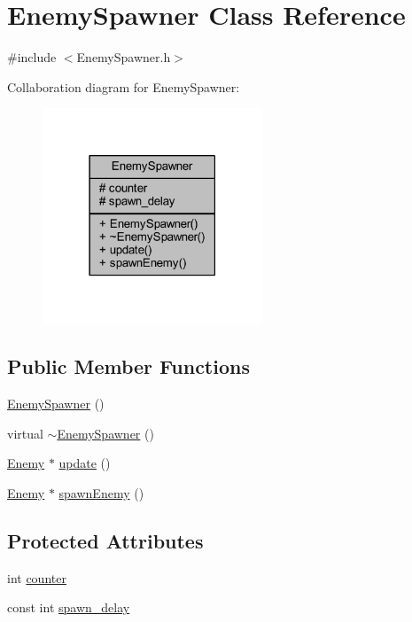 \hypertarget{class_enemy_spawner}{}\section{Enemy\+Spawner Class Reference}
\label{class_enemy_spawner}


{\ttfamily \#include $<$Enemy\+Spawner.\+h$>$}



Collaboration diagram for Enemy\+Spawner\+:
\nopagebreak
\begin{figure}[H]
\begin{center}
\leavevmode
\includegraphics[width=186pt]{class_enemy_spawner__coll__graph}
\end{center}
\end{figure}
\subsection*{Public Member Functions}
\begin{DoxyCompactItemize}
\item 
\hyperlink{class_enemy_spawner_a4c3dac46ddd4f9e97bac15cf42b2f931}{Enemy\+Spawner} ()
\item 
virtual \hyperlink{class_enemy_spawner_a661639d8aa3e52a1249883c34d11f0ad}{$\sim$\+Enemy\+Spawner} ()
\item 
\hyperlink{class_enemy}{Enemy} $\ast$ \hyperlink{class_enemy_spawner_a1b00731679380c088027072b11583d6c}{update} ()
\item 
\hyperlink{class_enemy}{Enemy} $\ast$ \hyperlink{class_enemy_spawner_adc9ba92ad7028dc28e1599fea871e132}{spawn\+Enemy} ()
\end{DoxyCompactItemize}
\subsection*{Protected Attributes}
\begin{DoxyCompactItemize}
\item 
int \hyperlink{class_enemy_spawner_a10072a5aab9a1d055df222ee0ef3fe6e}{counter}
\item 
const int \hyperlink{class_enemy_spawner_a925cbf3cbaadaf7b376ef6aadc955d7f}{spawn\+\_\+delay}
\end{DoxyCompactItemize}


